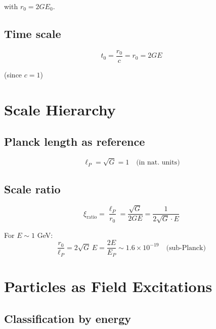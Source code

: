 	with $r_0 = 2GE_0$.
	
	\subsection{Time scale}
	
	\begin{equation}
		t_0 = \frac{r_0}{c} = r_0 = 2GE
	\end{equation}
	
	(since $c = 1$)
	
	\section{Scale Hierarchy}
	\label{sec:scale_hierarchy}
	
	\subsection{Planck length as reference}
	
	\begin{equation}
		\ell_P = \sqrt{G} = 1 \quad \text{(in nat. units)}
	\end{equation}
	
	\subsection{Scale ratio}
	
	\begin{equation}
		\xi_{\text{ratio}} = \frac{\ell_P}{r_0} = \frac{\sqrt{G}}{2GE} = \frac{1}{2\sqrt{G} \cdot E}
	\end{equation}
	
	For $E \sim 1$ GeV:
	\begin{equation}
		\frac{r_0}{\ell_P} = 2\sqrt{G}\,E = \frac{2E}{E_P} \sim 1.6\times10^{-19} \quad \text{(sub-Planck)}
	\end{equation}
	
	\section{Particles as Field Excitations}
	\label{sec:particles}
	
	\subsection{Classification by energy}
	
